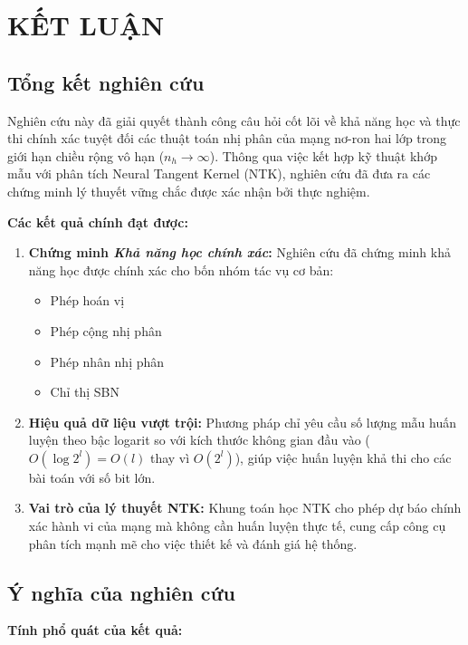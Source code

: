 \chapter{KẾT LUẬN}

\section{Tổng kết nghiên cứu}

Nghiên cứu này đã giải quyết thành công câu hỏi cốt lõi về khả năng học và thực thi chính xác tuyệt đối các thuật toán nhị phân của mạng nơ-ron hai lớp trong giới hạn chiều rộng vô hạn ($n_h \rightarrow \infty$). Thông qua việc kết hợp kỹ thuật khớp mẫu với phân tích Neural Tangent Kernel (NTK), nghiên cứu đã đưa ra các chứng minh lý thuyết vững chắc được xác nhận bởi thực nghiệm.

\textbf{Các kết quả chính đạt được:}

\begin{enumerate}
    \item \textbf{Chứng minh \textit{Khả năng học chính xác}:} Nghiên cứu đã chứng minh khả năng học được chính xác cho bốn nhóm tác vụ cơ bản:
    \begin{itemize}
        \item Phép hoán vị
        \item Phép cộng nhị phân
        \item Phép nhân nhị phân
        \item Chỉ thị SBN
    \end{itemize}
    
    \item \textbf{Hiệu quả dữ liệu vượt trội:} Phương pháp chỉ yêu cầu số lượng mẫu huấn luyện theo bậc logarit so với kích thước không gian đầu vào ($O(\log 2^l) = O(l)$ thay vì $O(2^l)$), giúp việc huấn luyện khả thi cho các bài toán với số bit lớn.
    
    \item \textbf{Vai trò của lý thuyết NTK:} Khung toán học NTK cho phép dự báo chính xác hành vi của mạng mà không cần huấn luyện thực tế, cung cấp công cụ phân tích mạnh mẽ cho việc thiết kế và đánh giá hệ thống.
\end{enumerate}

\section{Ý nghĩa của nghiên cứu}

\textbf{Tính phổ quát của kết quả:}

